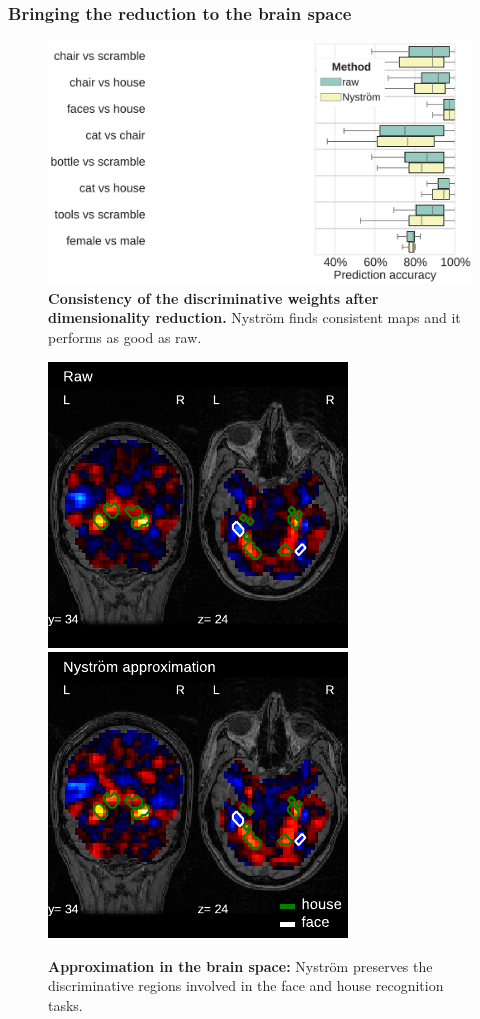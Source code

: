 \documentclass{beamer}
\begin{document}
\begin{frame}\frametitle{\textbf{Bringing the reduction to the brain space}}
\begin{figure}
\centering
\includegraphics[width=1\linewidth]{figures/correlation_1.pdf}
\caption{\textbf{Consistency of the discriminative weights after dimensionality 
reduction.} Nystr\"om finds consistent maps and it performs as good as raw.}
\end{figure}
\end{frame}


\begin{frame}
\begin{figure}
\centering
\includegraphics[width=0.43\linewidth]{figures/raw_faces_vs_house_1.pdf}\quad 
\includegraphics[width=0.43\linewidth]{figures/nystrom_faces_vs_house_1.pdf}
\caption{\textbf{Approximation in the brain space:} Nystr\"om preserves the 
discriminative regions involved in the face and house recognition tasks.}
\end{figure}
\end{frame}
\end{document}
